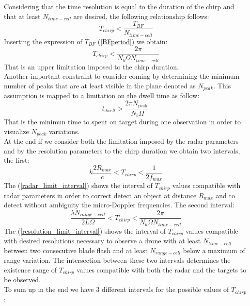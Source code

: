 Considering that the time resolution is equal to the duration of the chirp and that at least $N_{time-cell}$ are desired, the following relationship follows:
\begin{equation}
T_{chirp}<\frac{T_{BF}}{N_{time-cell}}
\label{time_cell_limit}
\end{equation}
Inserting the expression of $T_{BF}$ (\ref{BFperiod}) we obtain:
\begin{equation}
T_{chirp}<\frac{2 \pi}{N_{b} \Omega N_{time-cell}}
\label{max_chirp_rt}
\end{equation}
That is an upper limitation imposed to the chirp duration.\\
Another important constraint to consider coming by determining the minimum number of peaks that are at least visible in the plane denoted as $N_{peak}$. This assumption is mapped to a limitation on the dwell time as follow:
\begin{equation}
t_{dwell}>\frac{2 \pi N_{\text {peak }}}{N_{b} \Omega}
\label{dwell_rt_limit}
\end{equation}
That is the minimun time to spent on target during one observation in order to visualize $N_{peak}$ variations.\\
At the end if we consider both the limitation imposed by the radar parameters and by the resolution parameters to the chirp duration we obtain two intervals, the first:
\begin{equation}
k \frac{2R_{max}}{c}<T_{chirp}<\frac{1}{2 f_{max}}
\label{radar_limit_interval}
\end{equation}
The (\ref{radar_limit_interval}) shows the interval of $T_{chirp}$ values compatible with radar parameters in order to correct detect an object at distance $R_{max}$ and to detect without ambiguity the micro-Doppler frequencies. The second interval:
\begin{equation}
\frac{\lambda N_{range-cell }}{2 L \Omega}<T_{chirp}<\frac{2 \pi}{N_{b} \Omega N_{time-cell}}
\label{resolution_limit_interval}
\end{equation}
The (\ref{resolution_limit_interval}) shows the interval of $T_{chirp}$ values compatible with desired resolutions necessary to observe a drone with at least $N_{time-cell}$ between two consecutive blade flash and at least $N_{range-cell }$ below a maximum of range variation. The intersection between these two intervals determines the existence range of $T_{chirp}$ values compatible with both the radar and the targets to be observed.\\
To sum up in the end we have 3 different intervals for the possible values of $T_{chirp}$:

